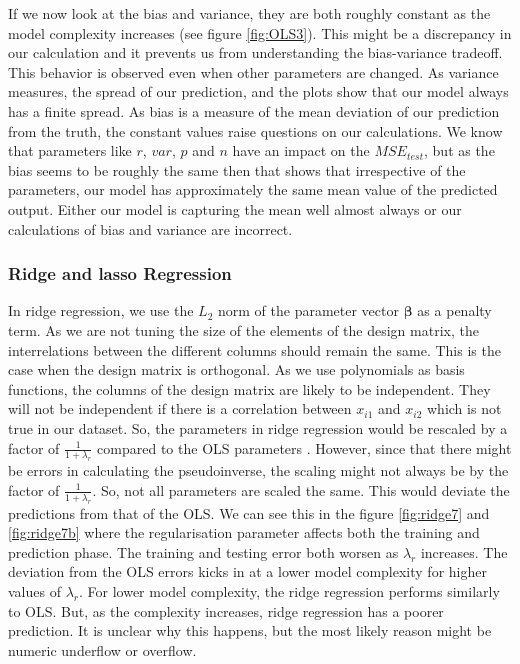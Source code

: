 If we now look at the bias and variance, they are both roughly constant as the model complexity increases (see figure \ref{fig:OLS3}). This might be a discrepancy in our calculation and it prevents us from understanding the bias-variance tradeoff. This behavior is observed even when other parameters are changed. As variance measures, the spread of our prediction, and the plots show that our model always has a finite spread. As bias is a measure of the mean deviation of our prediction from the truth, the constant values raise questions on our calculations. We know that parameters like $r$, $var$, $p$ and $n$ have an impact on the $MSE_{test}$, but as the bias seems to be roughly the same then that shows that irrespective of the parameters, our model has approximately the same mean value of the predicted output. Either our model is capturing the mean well almost always or our calculations of bias and variance are incorrect.

\subsubsection{Ridge and lasso Regression}
In ridge regression, we use the $L_2$ norm of the parameter vector $\boldsymbol \beta$ as a penalty term. As we are not tuning the size of the elements of the design matrix, the interrelations between the different columns should remain the same. This is the case when the design matrix is orthogonal. As we use polynomials as basis functions, the columns of the design matrix are likely to be independent. They will not be independent if there is a correlation between $x_{i1}$ and $x_{i2}$ which is not true in our dataset. So, the parameters in ridge regression would be rescaled by a factor of $\frac{1}{1+\lambda_r}$ compared to the OLS parameters \cite{mehta2019high}. However, since that there might be errors in calculating the pseudoinverse, the scaling might not always be by the factor of $\frac{1}{1+\lambda_r}$. So, not all parameters are scaled the same. This would deviate the predictions from that of the OLS. We can see this in the figure \ref{fig:ridge7} and \ref{fig:ridge7b} where the regularisation parameter affects both the training and prediction phase. The training and testing error both worsen as $\lambda_r$ increases. The deviation from the OLS errors kicks in at a lower model complexity for higher values of  $\lambda_r$. For lower model complexity, the ridge regression performs similarly to OLS. But, as the complexity increases, ridge regression has a poorer prediction. It is unclear why this happens, but the most likely reason might be numeric underflow or overflow. 




